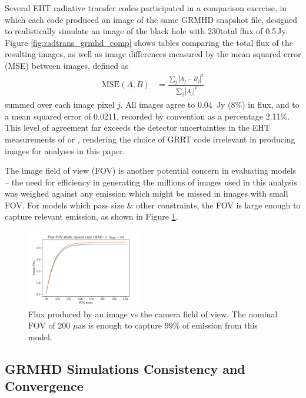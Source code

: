 Several EHT radiative transfer codes participated in a comparison exercise, in which each code produced an image of the same GRMHD snapshot file, designed to realistically simulate an image of the black hole  with 230\GHz total flux of 0.5\,Jy. Figure \ref{fig:radtrans_grmhd_comp} shows tables comparing the total flux of the resulting images, as well as image differences measured by the mean squared error (MSE) between images, defined as
\begin{align}
    \mathrm{MSE}(A, B) &= \frac{\sum_j|A_j-B_j|^2}{\sum_j|A_j|^2}
\end{align}
summed over each image pixel $j$. All images agree to 0.04~Jy (8\%) in flux, and to a mean squared error of 0.0211, recorded by convention as a percentage 2.11\%.  This level of agreement far exceeds the detector uncertainties in the EHT measurements of \sgra or , rendering the choice of GRRT code irrelevant in producing images for analyses in this paper.

The image field of view (FOV) is another potential concern in evaluating models -- the need for efficiency in generating the millions of images used in this analysis was weighed against any emission which might be missed in images with small FOV. For models which pass size \& other constraints, the FOV is large enough to capture relevant emission, as shown in Figure \ref{fig:radtrans_fov_study}.

\begin{figure}
  \centering
  \includegraphics[width=0.45\textwidth]{figures/fov_study.pdf}
  \caption{Flux produced by an image vs the camera field of view. The nominal FOV of 200 $\mu\mathrm{as}$ is enough to capture 99\% of emission from this model.}
  \label{fig:radtrans_fov_study}
\end{figure}

\subsection{GRMHD Simulations Consistency and Convergence}\label{app:resolution_study}

